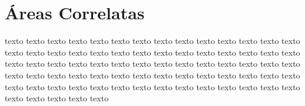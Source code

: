 \section{Áreas Correlatas}
\label{sec:other_areas}

texto texto texto texto texto texto texto texto texto texto texto texto texto texto texto texto texto texto texto texto texto texto texto texto texto texto texto texto texto texto texto texto texto texto texto texto texto texto texto texto texto texto texto texto texto texto texto texto texto texto texto texto texto texto texto texto texto texto texto texto texto texto texto texto texto texto texto texto texto texto texto texto texto texto texto 